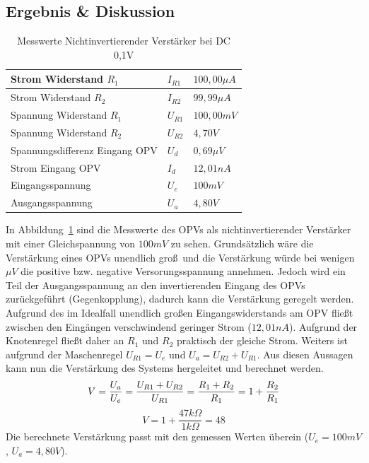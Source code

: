 \documentclass[12pt,a4paper,titlepage]{article}
\begin{document}
\subsection{Ergebnis \& Diskussion}
\begin{table}[H]
\centering
\begin{tabular}{|l|l|l|}
\hline
Strom Widerstand $R_1$ & $I_{R1}$ & $100,00\mu A$  \\ \hline
Strom Widerstand $R_2$ & $I_{R2}$ & $99,99\mu A$  \\ \hline
Spannung Widerstand $R_1$ & $U_{R1}$ & $100,00mV$  \\ \hline
Spannung Widerstand $R_2$ & $U_{R2}$ & $4,70V$ \\ \hline
Spannungsdifferenz Eingang OPV & $U_d$  & $0,69\mu V$      \\ \hline
Strom Eingang OPV & $I_d$  & $12,01nA$ \\ \hline
Eingangsspannung & $U_e$  & $100mV$        \\ \hline
Ausgangsspannung & $U_a$  & $4,80V$   \\ \hline
\end{tabular}
\caption{Messwerte Nichtinvertierender Verst\"arker bei DC 0,1V}
\label{figure02}
\end{table}
In Abbildung~\ref{figure02} sind die Messwerte des OPVs als nichtinvertierender Verst\"arker mit einer Gleichspannung von $100mV$ zu sehen. Grunds\"atzlich w\"are die Verst\"arkung eines OPVs unendlich gro\ss \, und die Verst\"arkung w\"urde bei wenigen $\mu V$ die positive bzw. negative Versorungsspannung annehmen. Jedoch wird ein Teil der Ausgangsspannung an den invertierenden Eingang des OPVs zur\"uckgef\"uhrt (Gegenkopplung), dadurch kann die Verst\"arkung geregelt werden. Aufgrund des im Idealfall unendlich gro\ss en Eingangswiderstands am OPV flie\ss t zwischen den Eing\"angen verschwindend geringer Strom ($12,01nA$). Aufgrund der Knotenregel flie\ss t daher an $R_1$ und $R_2$ praktisch der gleiche Strom. Weiters ist aufgrund der Maschenregel $U_{R1} = U_e$ und $U_a = U_{R2} + U_{R1}$. Aus diesen Aussagen kann nun die Verst\"arkung des Systems hergeleitet und berechnet werden.\\
\begin{equation*}
  V = \frac{U_a}{U_e} = \frac{U_{R1} + U_{R2}}{U_{R1}} = \frac{R_1 + R_2}{R_1} = 1+ \frac{R_2}{R_1} \\
\end{equation*}
\begin{equation*}
  V = 1 + \frac{47 k\Omega}{1 k\Omega} = 48
\end{equation*}
\noindent Die berechnete Verst\"arkung passt mit den gemessen Werten \"uberein ($U_e = 100mV$, $U_a = 4,80V$).
\end{document}
